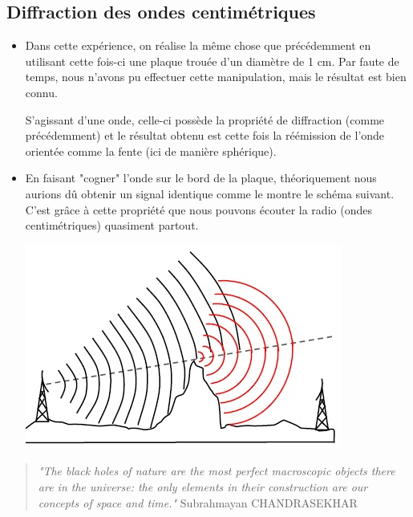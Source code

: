 \documentclass[12pt,a4paper]{article}
\begin{document}
	\subsection{Diffraction des ondes centimétriques}
	\begin{itemize}[label=$\circ$]
		\item Dans cette expérience, on réalise la même chose que précédemment en utilisant cette fois-ci une plaque trouée d'un diamètre de 1 cm. Par faute de temps, nous n'avons pu effectuer cette manipulation, mais le résultat est bien connu. 
		
		S'agissant d'une onde, celle-ci possède la propriété de diffraction (comme précédemment) et le résultat obtenu est cette fois la réémission de l'onde orientée comme la fente (ici de manière sphérique).
		
		\item En faisant "cogner" l'onde sur le bord de la plaque, théoriquement nous aurions dû obtenir un signal identique comme le montre le schéma suivant. C'est grâce à cette propriété que nous pouvons écouter la radio (ondes centimétriques) quasiment partout. 
		\begin{center}
			\includegraphics[scale=0.5]{schem4}
			
		\end{center}
	\end{itemize} 
	\begin{quotation}
		\textit{"The black holes of nature are the most perfect macroscopic objects there are in the universe: the only elements in their construction are our concepts of space and time."} Subrahmayan CHANDRASEKHAR
	\end{quotation}
	
\end{document}
